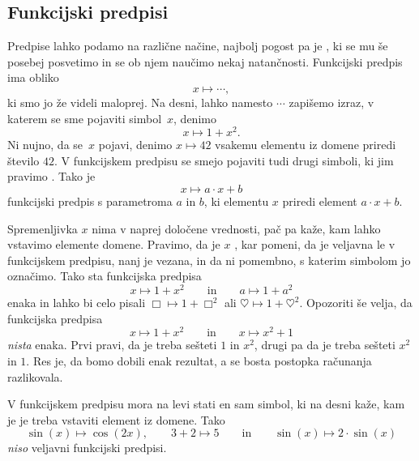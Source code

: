 \subsection{Funkcijski predpisi}
\label{sec:funkcijski-predpisi}

Predpise lahko podamo na različne načine, najbolj pogost pa je , ki
se mu še posebej posvetimo in se ob njem naučimo nekaj natančnosti. Funkcijski predpis ima
obliko
%
\begin{equation*}
  x \mapsto \cdots,
\end{equation*}
%
ki smo jo že videli maloprej. Na desni, lahko namesto $\cdots$ zapišemo izraz, v katerem
se sme pojaviti simbol~$x$, denimo
%
\begin{equation*}
  x \mapsto 1 + x^2.
\end{equation*}
%
Ni nujno, da se~$x$ pojavi, denimo $x \mapsto 42$ vsakemu elementu iz domene priredi
število $42$. V funkcijskem predpisu se smejo pojaviti tudi drugi simboli, ki jim
pravimo . Tako je
%
\begin{equation*}
  x \mapsto a \cdot x + b
\end{equation*}
%
funkcijski predpis s parametroma $a$ in $b$, ki elementu $x$ priredi element $a \cdot x + b$.

Spremenljivka $x$ nima v naprej določene vrednosti, pač pa kaže, kam lahko vstavimo
elemente domene. Pravimo, da je $x$ , kar pomeni, da je veljavna
le v funkcijskem predpisu, nanj je vezana, in da ni pomembno, s katerim simbolom jo
označimo. Tako sta funkcijska predpisa
%
\begin{equation*}
  x \mapsto 1 + x^2
  \qquad\text{in}\qquad
  a \mapsto 1 + a^2
\end{equation*}
%
enaka in lahko bi celo pisali $\Box \mapsto 1 + \Box^2$ ali
$\heartsuit \mapsto 1 + \heartsuit^2$.  Opozoriti še velja, da funkcijska predpisa
%
\begin{equation*}
  x \mapsto 1 + x^2
  \qquad\text{in}\qquad
  x \mapsto x^2 + 1
\end{equation*}
%
\emph{nista} enaka. Prvi pravi, da je treba sešteti $1$ in $x^2$, drugi pa da je treba
sešteti $x^2$ in $1$. Res je, da bomo dobili enak rezultat, a se bosta postopka računanja
razlikovala.

V funkcijskem predpisu mora na levi stati en sam simbol, ki na desni kaže, kam je je treba
vstaviti element iz domene. Tako
%
\begin{equation*}
  \sin(x) \mapsto \cos(2 x),
  \qquad
  3 + 2 \mapsto 5
  \qquad\text{in}\qquad
  \sin(x) \mapsto 2 \cdot \sin(x)
\end{equation*}
%
\emph{niso} veljavni funkcijski predpisi.

